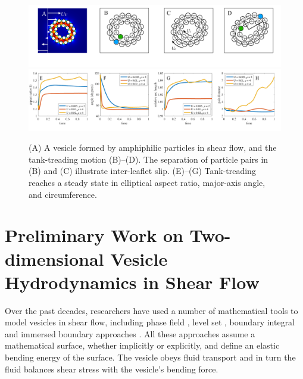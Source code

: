 \begin{figure}[!]
\begin{center}
\includegraphics[width=1\textwidth]{figures/PW_fig1A-D.pdf}
\includegraphics[width=1\textwidth]{figures/PW_fig1E-H.pdf}
\end{center}\vspace{-0.3in}
\caption{(A) A vesicle formed by amphiphilic particles in shear flow,
  and the tank-treading motion (B)--(D). The separation of particle
  pairs in (B) and (C) illustrate inter-leaflet slip.  (E)--(G)
  Tank-treading reaches a steady state in elliptical aspect ratio,
  major-axis angle, and circumference.}
\label{fig:tanktreading}
\end{figure}
\section{Preliminary Work on Two-dimensional Vesicle Hydrodynamics in Shear Flow} 
%
Over the past decades, researchers have used a number of mathematical tools 
to model vesicles in shear flow, including  phase field \cite{DuLiuWang2004_JCP,BibenKassnerMisbah2005_PRE}, 
level set \cite{DoyeuxGuyotChabannesEtAl2013_JCAM}, boundary integral \cite{Shravan09,Rahimian15} and 
immersed boundary approaches \cite{KimLai2010_JCP,KimLai2012_PRE,HuLaiSeolEtAl2016_JCP}. All these approaches
assume a mathematical surface, whether implicitly or explicitly, 
and define an elastic bending energy of the surface. The vesicle obeys fluid
transport and in turn the fluid balances shear stress with the vesicle's bending force. 

